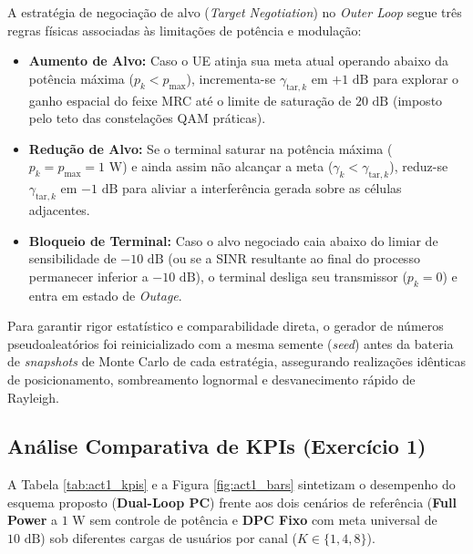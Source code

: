 A estratégia de negociação de alvo (\textit{Target Negotiation}) no \textit{Outer Loop} segue três regras físicas associadas às limitações de potência e modulação:
\begin{itemize}
    \item \textbf{Aumento de Alvo:} Caso o UE atinja sua meta atual operando abaixo da potência máxima ($p_k < p_{\max}$), incrementa-se $\gamma_{\text{tar},k}$ em $+1\text{ dB}$ para explorar o ganho espacial do feixe MRC até o limite de saturação de $20\text{ dB}$ (imposto pelo teto das constelações QAM práticas).
    \item \textbf{Redução de Alvo:} Se o terminal saturar na potência máxima ($p_k = p_{\max} = 1\text{ W}$) e ainda assim não alcançar a meta ($\gamma_k < \gamma_{\text{tar},k}$), reduz-se $\gamma_{\text{tar},k}$ em $-1\text{ dB}$ para aliviar a interferência gerada sobre as células adjacentes.
    \item \textbf{Bloqueio de Terminal:} Caso o alvo negociado caia abaixo do limiar de sensibilidade de $-10\text{ dB}$ (ou se a SINR resultante ao final do processo permanecer inferior a $-10\text{ dB}$), o terminal desliga seu transmissor ($p_k = 0$) e entra em estado de \textit{Outage}.
\end{itemize}

Para garantir rigor estatístico e comparabilidade direta, o gerador de números pseudoaleatórios foi reinicializado com a mesma semente (\textit{seed}) antes da bateria de \textit{snapshots} de Monte Carlo de cada estratégia, assegurando realizações idênticas de posicionamento, sombreamento lognormal e desvanecimento rápido de Rayleigh.

\subsection{Análise Comparativa de KPIs (Exercício 1)}

A Tabela \ref{tab:act1_kpis} e a Figura \ref{fig:act1_bars} sintetizam o desempenho do esquema proposto (\textbf{Dual-Loop PC}) frente aos dois cenários de referência (\textbf{Full Power} a $1\text{ W}$ sem controle de potência e \textbf{DPC Fixo} com meta universal de $10\text{ dB}$) sob diferentes cargas de usuários por canal ($K \in \{1, 4, 8\}$).


